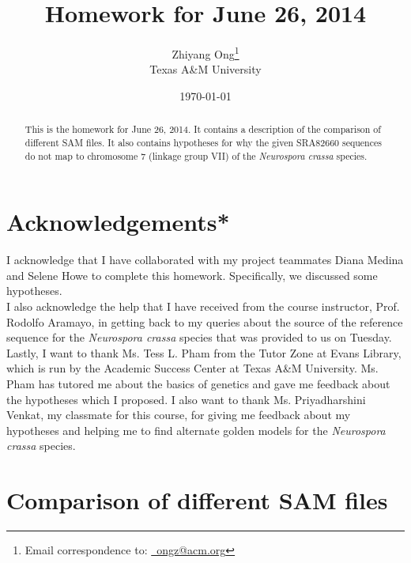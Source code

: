 \documentclass[letter,12pt]{article}
\begin{document}
\title{Homework for June 26, 2014}
\date{\today}
\author{Zhiyang Ong\thanks{Email correspondence to: \href{mailto:ongz@acm.org}{\Email\ ongz@acm.org}}\\
	Texas A\&M University
}
\maketitle


\begin{abstract} 
This is the homework for June 26, 2014. It contains a description of the comparison of different SAM files. It also contains hypotheses for why the given SRA82660 sequences do not map to chromosome 7 (linkage group VII) of the {\it Neurospora crassa} species.
\end{abstract}




\section{Acknowledgements*}
\label{sec:Acknowledgement*}

I acknowledge that I have collaborated with my project teammates Diana Medina and Selene Howe to complete this homework. Specifically, we discussed some hypotheses. \\

I also acknowledge the help that I have received from the course instructor, Prof. Rodolfo Aramayo, in getting back to my queries about the source of the reference sequence for the {\it Neurospora crassa} species that was provided to us on Tuesday. \\

Lastly, I want to thank Ms. Tess L. Pham from the Tutor Zone at Evans Library, which is run by the Academic Success Center at Texas A\&M University. Ms. Pham has tutored me about the basics of genetics and gave me feedback about the hypotheses which I proposed. I also want to thank Ms. Priyadharshini Venkat, my classmate for this course, for giving me feedback about my hypotheses and helping me to find alternate golden models for the {\it Neurospora crassa} species.

  

\section{Comparison of different SAM files}
\label{sec:ComparisonofDifferentSAMfiles}
\end{document}
